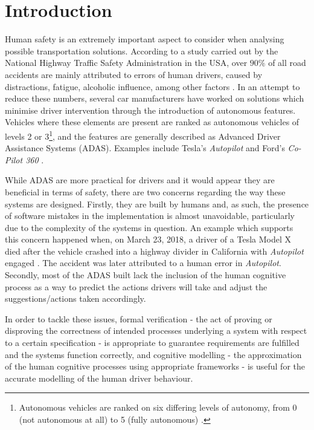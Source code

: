\chapter{Introduction}

Human safety is an extremely important aspect to consider when analysing possible transportation solutions. According to a study carried out by the National Highway Traffic Safety Administration in the USA, over $90\%$ of all road accidents are mainly attributed to errors of human drivers, caused by distractions, fatigue, alcoholic influence, among other factors \cite{crashes}. In an attempt to reduce these numbers, several car manufacturers have worked on solutions which minimise driver intervention through the introduction of autonomous features. Vehicles where these elements are present are ranked as autonomous vehicles of levels 2 or 3\footnote{Autonomous vehicles are ranked on six differing levels of autonomy, from 0 (not autonomous at all) to 5 (fully autonomous) \cite{wired}.}, and the features are generally described as Advanced Driver Assistance Systems (ADAS). Examples include Tesla's \textit{Autopilot} and Ford's \textit{Co-Pilot 360} \cite{autopilot1, ford}.

While ADAS are more practical for drivers and it would appear they are beneficial in terms of safety, there are two concerns regarding the way these systems are designed. Firstly, they are built by humans and, as such, the presence of software mistakes in the implementation is almost unavoidable, particularly due to the complexity of the systems in question. An example which supports this concern happened when, on March 23, 2018, a driver of a Tesla Model X died after the vehicle crashed into a highway divider in California with \textit{Autopilot} engaged \cite{autopilot2}. The accident was later attributed to a human error in \textit{Autopilot}. Secondly, most of the ADAS built lack the inclusion of the human cognitive process as a way to predict the actions drivers will take and adjust the suggestions/actions taken accordingly. 

In order to tackle these issues, formal verification - the act of proving or disproving the correctness of intended processes underlying a system with respect to a certain specification \cite{bk08} - is appropriate to guarantee requirements are fulfilled and the systems function correctly, and cognitive modelling - the approximation of the human cognitive processes using appropriate frameworks \cite{actr_1} - is useful for the accurate modelling of the human driver behaviour.

